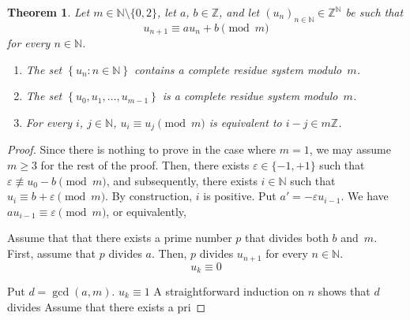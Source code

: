 \documentclass[12pt]{article}
\newcommand{\bZ}{\mathbb{Z}}
\newcommand{\bN}{\mathbb{N}} %
\newtheorem{theorem}{Theorem}
\theoremstyle{definition}
\begin{document}
 \begin{theorem} \label{thm:a-and-m-coprime}
   Let $m \in \bN \setminus \{ 0, 2 \}$,
   let $a$, $b \in \bZ$, and
   let $\left(u_n \right)_{n \in \bN} \in \bZ^\bN$ be such that
   $$u_{n + 1} \equiv a u_n + b \pmod m$$
   for every $n \in \bN$.
   \begin{enumerate}
     \item 
       The set $\left\{ u_n : n \in \bN \right\}$ contains a complete residue system modulo~$m$.
      \item 
        The set $\left\{ u_0, u_1, \dotsc, u_{m - 1} \right\}$ is a complete residue system modulo~$m$.
      \item
        For every $i$, $j \in \bN$, $u_i \equiv u_j \pmod m$ is equivalent to $i - j \in m \bZ$.
    \end{enumerate} 
 \end{theorem}

 
 \begin{proof}
   Since there is nothing to prove in the case where $m = 1$, we may assume $m \ge 3$ for the rest of the proof.
   Then,
   there exists $\varepsilon \in \{ -1, + 1 \}$ such that $\varepsilon \not \equiv u_0 - b \pmod m$,
   and subsequently,
   there exists $i \in \bN$ such that $u_i \equiv b + \varepsilon \pmod m$.
   By construction, $i$ is positive.
   Put $a' = - \varepsilon u_{i - 1}$.
   We have  $a  u_{i - 1}  \equiv \varepsilon  \pmod m$, or equivalently,
 
   
   

   

   
   Assume that that there exists a prime number $p$ that divides both $b$ and~$m$.
   First,  assume that $p$ divides $a$.
   Then, $p$ divides $u_{n + 1}$ for every $n \in \bN$.
   $$
    u_k \equiv 0
   $$

 
   
   
   Put $d = \gcd(a, m)$.
   $u_k \equiv 1$
   A straightforward induction on $n$ shows that $d$ divides    Assume that there exists a pri
   
 \end{proof}
 
\end{document}
